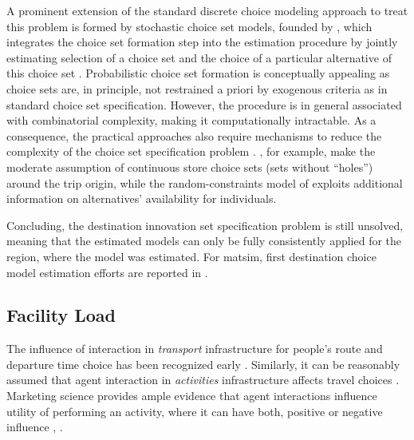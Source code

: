 A prominent extension of the standard discrete choice modeling approach to treat this problem is formed by stochastic choice set models, founded by \citet[][]{Manski_TD_1977, BurnettKPHanson_TRR_1979, BurnettKP_UG_1980}, which integrates the choice set formation step into the estimation procedure by jointly estimating selection of a choice set and the choice of a particular alternative of this choice set \citep[][]{KaplanEtAl_TRB_2009, PagliaraTimmermans_TransLett_2009, Manski_TD_1977, Swait_TransResPartB_2001, HorowitzLouviere_IJRM_1995, BenAkivaBoccara_IJRM_1995, SwaitBenAkiva_TransResPartB_1987, Swait_TransResPartB_2001, MartinezEtAl_TransResPartB_2009, CascettaPapola_TransResPartA_2009, BierlaireEtAl_2_STRC_2009, ScroginEtAl_TechRep_UCF_2004, ManraiAndrews_EJOR_1998, Ansah_TransRes_1977}. 
Probabilistic choice set formation is conceptually appealing as choice sets are, in principle, not restrained a priori by exogenous criteria as in standard choice set specification. 
However, the procedure is in general associated with combinatorial complexity, making it computationally intractable. 
As a consequence, the practical approaches also require mechanisms to reduce the complexity of the choice set specification problem \citep[e.g.,][p.11]{BenAkivaBoccara_IJRM_1995}. 
\citet[][]{ZhengJieGuo_TRB_2008}, for example, make the moderate assumption of continuous store choice sets (\ie sets without ``holes'') around the trip origin, while the random-constraints model of \citet[][]{BenAkivaBoccara_IJRM_1995} exploits additional information on alternatives' availability for individuals.

Concluding, the destination innovation set specification problem is still unsolved, meaning that the estimated models can only be fully consistently applied for the region, where the model was estimated. 
For \gls{matsim}, first destination choice model estimation efforts are reported in \citet[][Chapter 5]{Horni_PhDThesis_2013}.

\subsection{Facility Load}
\label{sec:facilityload}
The influence of interaction in \emph{transport} infrastructure for people's route and departure time choice has been recognized early \citep[e.g.,][]{Pigou_1920, Knight_QJE_1924, Wardrop_PICE_1952}. 
Similarly, it can be reasonably assumed that agent interaction in \emph{activities} infrastructure affects travel choices \citep[][]{Axhausen_SSRL_2006}. 
Marketing science provides ample evidence that agent interactions influence utility of performing an activity, where it can have both, positive or negative influence \citep[][p.331]{BakerJEtAl_JAMS_1994}, \citep[][]{ErogluAndHarrell_JR_1986, ErogluAndMachleit_JR_1990, ErogluEtAl_JBR_2005, HarrellEtAl_JMR_1980, HuiAndBateson_JCR_1991, PonsEtAl_PsychMark_2006}.

